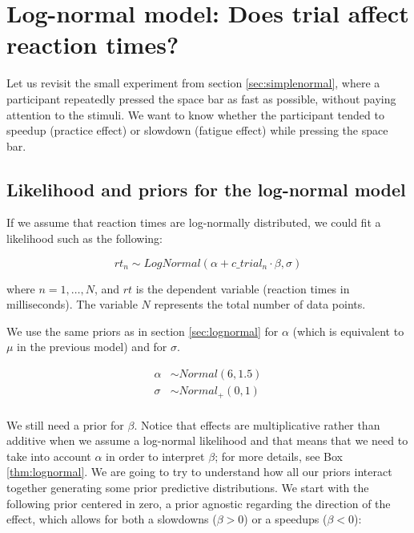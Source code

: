 \documentclass[12pt,]{krantz}
\theoremstyle{definition}
\theoremstyle{definition}
\theoremstyle{definition}
\theoremstyle{remark}
\begin{document}
\section{Log-normal model: Does trial affect reaction
times?}\label{sec:trial}

Let us revisit the small experiment from section \ref{sec:simplenormal},
where a participant repeatedly pressed the space bar as fast as
possible, without paying attention to the stimuli. We want to know
whether the participant tended to speedup (practice effect) or slowdown
(fatigue effect) while pressing the space bar.

\subsection{Likelihood and priors for the log-normal
model}\label{likelihood-and-priors-for-the-log-normal-model}

If we assume that reaction times are log-normally distributed, we could
fit a likelihood such as the following:

\begin{equation}
rt_n \sim LogNormal(\alpha + c\_trial_n \cdot \beta,\sigma)
\label{eq:rtloglik}
\end{equation}

where \(n =1, \ldots, N\), and \(rt\) is the dependent variable
(reaction times in milliseconds). The variable \(N\) represents the
total number of data points.

We use the same priors as in section \ref{sec:lognormal} for \(\alpha\)
(which is equivalent to \(\mu\) in the previous model) and for
\(\sigma\).

\begin{equation}
\begin{aligned}
\alpha &\sim Normal(6, 1.5) \\
\sigma &\sim Normal_+(0, 1)\\
\end{aligned}
\end{equation}

We still need a prior for \(\beta\). Notice that effects are
multiplicative rather than additive when we assume a log-normal
likelihood and that means that we need to take into account \(\alpha\)
in order to interpret \(\beta\); for more details, see Box
\ref{thm:lognormal}. We are going to try to understand how all our
priors interact together generating some prior predictive distributions.
We start with the following prior centered in zero, a prior agnostic
regarding the direction of the effect, which allows for both a slowdowns
(\(\beta>0\)) or a speedups (\(\beta<0\)):
\end{document}
